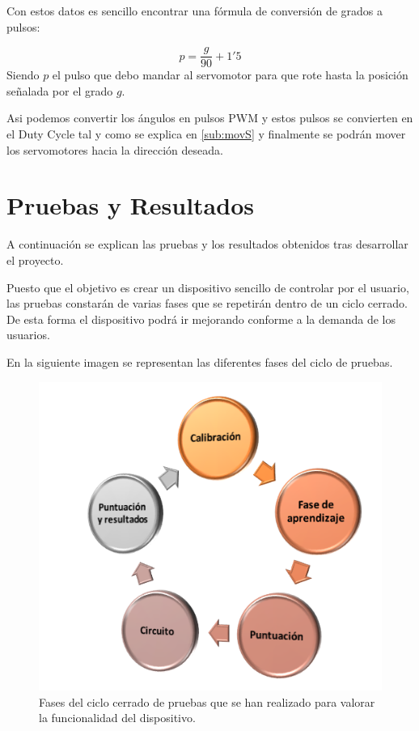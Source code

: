 \documentclass[twoside, 11pt]{epstfg}
\begin{document}
Con estos datos es sencillo encontrar una fórmula de conversión de grados a pulsos:

$$p = \frac{g}{90} + 1'5$$
Siendo $p$ el pulso que debo mandar al servomotor para que rote hasta la posición señalada por el grado $g$.

Asi podemos convertir los ángulos en pulsos PWM y estos pulsos se convierten en el Duty Cycle tal y como se explica en \ref{sub:movS} y finalmente se podrán mover los servomotores hacia la dirección deseada.


\chapter{Pruebas y Resultados}

A continuación se explican las pruebas y los resultados obtenidos tras desarrollar el proyecto.

Puesto que el objetivo es crear un dispositivo sencillo de controlar por el usuario, las pruebas constarán de varias fases que se repetirán dentro de un ciclo cerrado. De esta forma el dispositivo podrá ir mejorando conforme a la demanda de los usuarios.

En la siguiente imagen se representan las diferentes fases del ciclo de pruebas.

\begin{figure}[h!]
	\centerline{
		\mbox{\includegraphics[width=.60\textwidth]{images/CicloPruebas.png}}
	}
	\caption{Fases del ciclo cerrado de pruebas que se han realizado para valorar la funcionalidad del dispositivo.}
	\label{ciclo}
\end{figure}
\end{document}
